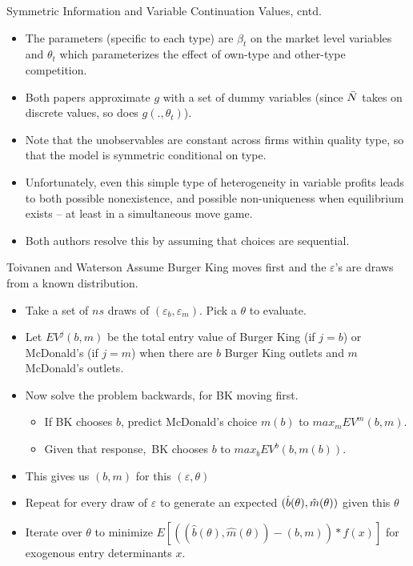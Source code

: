 \documentclass[aspectratio=169,11pt]{beamer}
\begin{document}
\begin{frame}{Symmetric Information and Variable Continuation Values,
cntd.}
\begin{itemize}
\item The parameters (specific to each type) are $\beta _{t}$ on the market
level variables and $\theta _{t}$ which parameterizes the effect of own-type
and other-type competition.
\item Both papers approximate $g$ with a set of dummy variables (since $\bar{%
N}$ takes on discrete values, so does $g(.,\theta _{t})$).
\item Note that the unobservables are constant across firms within quality
type, so that the model is symmetric conditional on type.
\item Unfortunately, even this simple type of heterogeneity in variable
profits leads to both possible nonexistence, and possible non-uniqueness
when equilibrium exists -- at least in a simultaneous move game.
\item Both authors resolve this by assuming that choices are sequential.
\end{itemize}
\end{frame}


\begin{frame}{Toivanen and Waterson}
Assume Burger King moves first and the $\varepsilon $'s are draws from a
known distribution.
\begin{itemize}
\item Take a set of $ns$ draws of $(\varepsilon _{b},\varepsilon _{m})$.
Pick a $\theta $ to evaluate.
\item Let $EV^{j}(b,m)$ be the total entry value of Burger King (if $j=b$)
or McDonald's (if $j=m$) when there are $b$ Burger King outlets and $m$
McDonald's outlets.
\item Now solve the problem backwards, for BK moving first.
\begin{itemize}
\item If BK chooses $b$, predict McDonald's choice $m(b)$ to $%
max_{m}EV^{m}(b,m)$.
\item Given that response,\ BK chooses $b$ to $max_{b}EV^{b}(b,m(b))$.
\end{itemize}
\item This gives us $(b,m)$ for this $(\varepsilon ,\theta )$
\item Repeat for every draw of $\varepsilon $ to generate an expected $(\hat{%
b}(\theta ),\hat{m}(\theta ))$ given this $\theta $
\item Iterate over $\theta $ to minimize $E[((\hat{b}(\theta ),\hat{m}%
(\theta ))-(b,m))\ast f(x)]$ for exogenous entry determinants $x$.
\end{itemize}
\end{frame}
\end{document}
